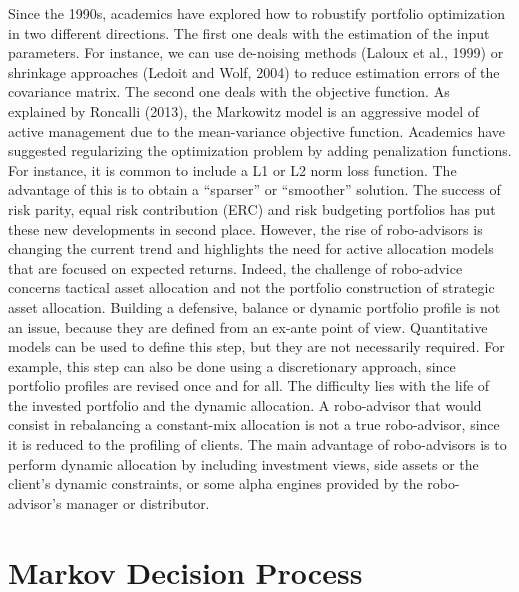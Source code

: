 \documentclass[]{usiinfdocprop}
\begin{document}
Since the 1990s, academics have explored how to robustify portfolio optimization in two different directions. The first one deals with the estimation of the input parameters. For instance, we can use de-noising methods (Laloux et al., 1999) or shrinkage approaches (Ledoit and Wolf, 2004) to reduce estimation errors of the covariance matrix. The second one deals with the objective function. As explained by Roncalli (2013), the Markowitz model is an aggressive model of active management due to the mean-variance objective function. Academics have suggested regularizing the optimization problem by adding penalization functions. For instance, it is common to include a L1 or L2 norm loss function. The advantage of this is to obtain a “sparser” or “smoother” solution.
The success of risk parity, equal risk contribution (ERC) and risk budgeting portfolios has put these new developments in second place. However, the rise of robo-advisors is changing the current trend and highlights the need for active allocation models that are focused on expected returns. Indeed, the challenge of robo-advice concerns tactical asset allocation and not the portfolio construction of strategic asset allocation. Building a defensive, balance or dynamic portfolio profile is not an issue, because they are defined from an ex-ante point of view. Quantitative models can be used to define this step, but they are not necessarily required. For example, this step can also be done using a discretionary approach, since portfolio profiles are revised once and for all. The difficulty lies with the life of the invested portfolio and the dynamic allocation. A robo-advisor that would consist in rebalancing a constant-mix allocation is not a true robo-advisor, since it is reduced to the profiling of clients. The main advantage of robo-advisors is to perform dynamic allocation by including investment views, side assets or the client’s dynamic constraints, or some alpha engines provided by the robo-advisor’s manager or distributor.





\section{Markov Decision Process}
\end{document}
